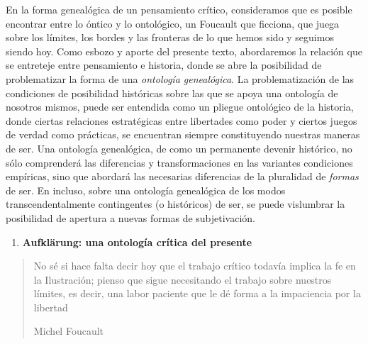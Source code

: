 \documentclass{book}
\begin{document}
En la forma genealógica de un pensamiento crítico, consideramos que es
posible encontrar entre lo óntico y lo ontológico, un Foucault que
ficciona, que juega sobre los límites, los bordes y las fronteras de lo
que hemos sido y seguimos siendo hoy. Como esbozo y aporte del presente
texto, abordaremos la relación que se entreteje entre pensamiento e
historia, donde se abre la posibilidad de problematizar la forma de una
\emph{ontología genealógica}. La problematización de las condiciones de
posibilidad históricas sobre las que se apoya una ontología de nosotros
mismos, puede ser entendida como un pliegue ontológico de la historia,
donde ciertas relaciones estratégicas entre libertades como poder y
ciertos juegos de verdad como prácticas, se encuentran siempre
constituyendo nuestras maneras de ser. Una ontología genealógica, de
como un permanente devenir histórico, no sólo comprenderá las
diferencias y transformaciones en las variantes condiciones empíricas,
sino que abordará las necesarias diferencias de la pluralidad de
\emph{formas} de ser. En incluso, sobre una ontología genealógica de los
modos transcendentalmente contingentes (o históricos) de ser, se puede
vislumbrar la posibilidad de apertura a nuevas formas de subjetivación.

\begin{enumerate}
\def\labelenumi{\arabic{enumi}.}
\setcounter{enumi}{1}
\item
  \textbf{Aufklärung: una ontología crítica del presente}
\end{enumerate}

\begin{quote}
No sé si hace falta decir hoy que el trabajo crítico todavía implica la
fe en la Ilustración; pienso que sigue necesitando el trabajo sobre
nuestros límites, es decir, una labor paciente que le dé forma a la
impaciencia por la libertad

Michel Foucault
\end{quote}
\end{document}
